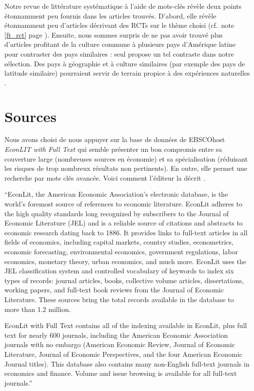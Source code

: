 \documentclass[pagesize, twoside=off, bibliography=totoc, DIV=calc, fontsize=12pt, a4paper, french]{scrartcl}
\begin{document}
Notre revue de littérature systématique à l’aide de mots-clés révèle deux points étonnamment peu fournis dans les articles trouvés. D’abord, elle révèle étonnamment peu d’articles décrivant des RCTs sur le thème choisi (cf.\ note \ref{ft_rct} page \pageref{ft_rct}). Ensuite, nous sommes surpris de ne pas avoir trouvé plus d’articles profitant de la culture commune à plusieurs pays d’Amérique latine pour contraster des pays similaires : seul \citet{trejos_inequality_2004} propose un tel contraste dans notre sélection. Des pays à géographie et à culture similaires (par exemple des pays de latitude similaire) pourraient servir de terrain propice à des expériences naturelles .

\appendix
\section{Sources}
\label{sec_search}
Nous avons choisi de nous appuyer sur la base de données de EBSCOhost \emph{EconLIT with Full Text} qui semble présenter un bon compromis entre sa couverture large (nombreuses sources en économie) et sa spécialisation (réduisant les risques de trop nombreux résultats non pertinents). En outre, elle permet une recherche par mots clés avancée.
Voici comment l’éditeur la décrit \citep{ebscohost_econlit_2024}.

“EconLit, the American Economic Association's electronic database, is the world's foremost source of references to economic literature. EconLit adheres to the high quality standards long recognized by subscribers to the Journal of Economic Literature (JEL) and is a reliable source of citations and abstracts to economic research dating back to 1886. It provides links to full-text articles in all fields of economics, including capital markets, country studies, econometrics, economic forecasting, environmental economics, government regulations, labor economics, monetary theory, urban economics, and much more. EconLit uses the JEL classification system and controlled vocabulary of keywords to index six types of records: journal articles, books, collective volume articles, dissertations, working papers, and full-text book reviews from the Journal of Economic Literature. These sources bring the total records available in the database to more than 1.2 million.

EconLit with Full Text contains all of the indexing available in EconLit, plus full text for nearly 600 journals, including the American Economic Association journals with no embargo (American Economic Review, Journal of Economic Literature, Journal of Economic Perspectives, and the four American Economic Journal titles). This database also contains many non-English full-text journals in economics and finance. Volume and issue browsing is available for all full-text journals.”
\end{document}
